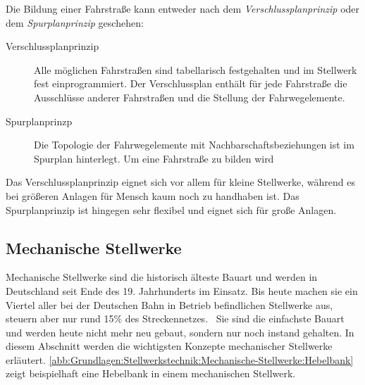 Die Bildung einer Fahrstraße kann entweder nach dem \textit{Verschlussplanprinzip} oder dem \textit{Spurplanprinzip} geschehen:

\begin{description}
    \item[Verschlussplanprinzip] Alle möglichen Fahrstraßen sind tabellarisch festgehalten und im Stellwerk fest einprogrammiert. Der Verschlussplan enthält für jede Fahrstraße die Ausschlüsse anderer Fahrstraßen und die Stellung der Fahrwegelemente.~\cite[][S. 122 f.]{bib:Sicherung-des-Schienenverkehrs}
    \item[Spurplanprinzp] Die Topologie der Fahrwegelemente mit Nachbarschaftsbeziehungen ist im Spurplan hinterlegt. Um eine Fahrstraße zu bilden wird ~\cite[][S. 123]{bib:Sicherung-des-Schienenverkehrs}
\end{description}

Das Verschlussplanprinzip eignet sich vor allem für kleine Stellwerke, während es bei größeren Anlagen für Mensch kaum noch zu handhaben ist. Das Spurplanprinzip ist hingegen sehr flexibel und eignet sich für große Anlagen.~\cite[][S. 124 f.]{bib:Sicherung-des-Schienenverkehrs}

\subsection{Mechanische Stellwerke}\label{text:Grundlagen:Stellwerkstechnik:Mechanische-Stellwerke}

Mechanische Stellwerke sind die historisch älteste Bauart und werden in Deutschland seit Ende des 19. Jahrhunderts im Einsatz. Bis heute machen sie ein Viertel aller bei der Deutschen Bahn in Betrieb befindlichen Stellwerke aus, steuern aber nur rund 15\% des Streckennetzes.~\cite{bib:DB:Stellwerke} Sie sind die einfachste Bauart und werden heute nicht mehr neu gebaut, sondern nur noch instand gehalten. In diesem Abschnitt werden die wichtigsten Konzepte mechanischer Stellwerke erläutert. \autoref{abb:Grundlagen:Stellwerkstechnik:Mechanische-Stellwerke:Hebelbank} zeigt beispielhaft eine Hebelbank in einem mechanischen Stellwerk.

